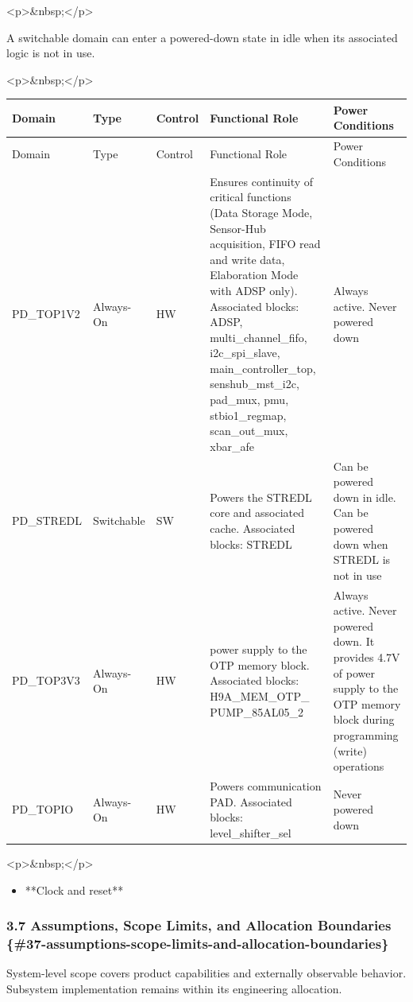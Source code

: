 \documentclass[11pt]{article}
\begin{document}
<p>\&nbsp;</p>

A switchable domain can enter a powered-down state in idle when its associated logic is not in use.

<p>\&nbsp;</p>



\begin{longtable}{|p{}|p{}|p{}|p{}|p{}|}
\hline
Domain & Type & Control & Functional Role & Power Conditions \\
\hline
\endfirsthead
\hline
Domain & Type & Control & Functional Role & Power Conditions \\
\hline
\endhead
PD\_TOP1V2 & Always-On & HW & Ensures continuity of critical functions (Data Storage Mode, Sensor-Hub acquisition, FIFO read and write data, Elaboration Mode with ADSP only). Associated blocks: ADSP, multi\_channel\_fifo, i2c\_spi\_slave, main\_controller\_top, senshub\_mst\_i2c, pad\_mux, pmu, stbio1\_regmap, scan\_out\_mux, xbar\_afe & Always active. Never powered down \\
\hline
PD\_STREDL & Switchable & SW & Powers the STREDL core and associated cache. Associated blocks: STREDL & Can be powered down in idle. Can be powered down when STREDL is not in use \\
\hline
PD\_TOP3V3 & Always-On & HW & power supply to the OTP memory block. Associated blocks: H9A\_MEM\_OTP\_ PUMP\_85AL05\_2 & Always active. Never powered down. It provides 4.7V of power supply to the OTP memory block during programming (write) operations \\
\hline
PD\_TOPIO & Always-On & HW & Powers communication PAD. Associated blocks: level\_shifter\_sel & Never powered down \\
\hline
\end{longtable}


<p>\&nbsp;</p>

\begin{itemize}
\item **Clock and reset**
\end{itemize}


\subsubsection{3.7 Assumptions, Scope Limits, and Allocation Boundaries \{\#37-assumptions-scope-limits-and-allocation-boundaries\}}


System-level scope covers product capabilities and externally observable behavior. Subsystem implementation remains within its engineering allocation.
\end{document}
